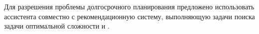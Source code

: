 
Для разрешения проблемы долгосрочного планирования предложено 
использовать ассистента совместно с рекомендационную систему,
выполняющую задачи поиска задачи оптимальной сложности и .
